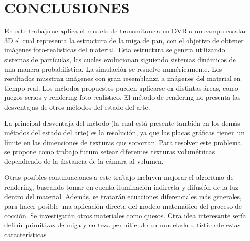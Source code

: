 \documentclass[oneside,a4paper,spanish,links]{amca}
\begin{document}

\section{CONCLUSIONES}

En este trabajo se aplica el modelo de transmitancia en DVR a un campo escalar 3D el cual representa la estructura de la miga de pan, con el objetivo de obtener im\'agenes foto-real\'isticas del material. Esta estructura se genera utilizando sistemas de part\'iculas, los cuales evolucionan siguiendo sistemas din\'amicos de una manera probabil\'istica. La simulaci\'on se resuelve num\'ericamente. Los resultados muestran im\'agenes con gran resemblanza a im\'agenes del material en tiempo real. Los m\'etodos propuestos pueden aplicarse en distintas \'areas, como juegos serios \citep{Susi2007} y rendering foto-real\'istico. El m\'etodo de rendering no presenta las desventajas de otros m\'etodos del estado del arte.

La principal desventaja del m\'etodo (la cual est\'a presente tambi\'en en los dem\'as m\'etodos del estado del arte) es la resoluci\'on, ya que las placas gr\'aficas tienen un l\'imite en las dimensiones de texturas que soportan. Para resolver este problema, se propone como trabajo futuro setear diferentes texturas volum\'etricas dependiendo de la distancia de la c\'amara al volumen.

Otras posibles continuaciones a este trabajo incluyen mejorar el algoritmo de rendering, buscando tomar en cuenta iluminaci\'on indirecta y difusión de la luz dentro del material. Adem\'as, se tratar\'an ecuaciones diferenciales m\'as generales, para hacer posible una aplicaci\'on directa del modelo matem\'atico del proceso de cocci\'on. Se investigar\'an otros materiales como quesos. Otra idea interesante ser\'ia definir primitivas de miga y corteza permitiendo un modelado art\'istico de estas caracter\'isticas. 

%

\end{document}
